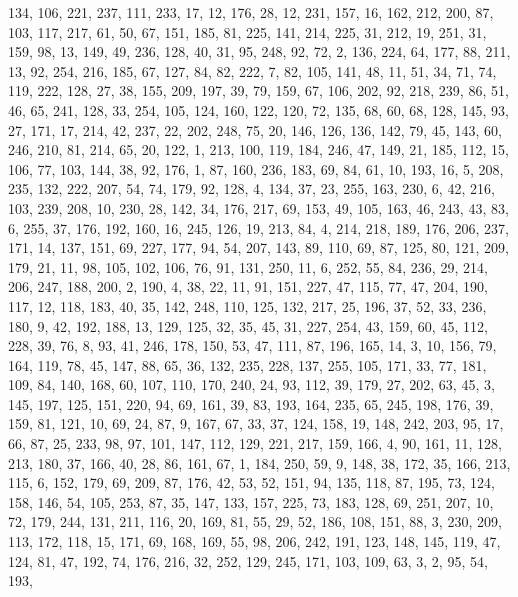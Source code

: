 \begin{DoxyCode}
       134, 106, 221, 237, 111, 233, 17, 12, 176, 28, 12, 231, 157, 16, 162, 212, 200, 87, 103, 117, 217, 61, 50,
       67, 151, 185, 81, 225, 141, 214, 225, 31, 212, 19, 251, 31, 159, 98, 13, 149, 49, 236, 128, 40, 31, 95, 248,
       92, 72, 2, 136, 224, 64, 177, 88, 211, 13, 92, 254, 216, 185, 67, 127, 84, 82, 222, 7, 82, 105, 141, 48, 11,
       51, 34, 71, 74, 119, 222, 128, 27, 38, 155, 209, 197, 39, 79, 159, 67, 106, 202, 92, 218, 239, 86, 51, 46,
       65, 241, 128, 33, 254, 105, 124, 160, 122, 120, 72, 135, 68, 60, 68, 128, 145, 93, 27, 171, 17, 214, 42,
       237, 22, 202, 248, 75, 20, 146, 126, 136, 142, 79, 45, 143, 60, 246, 210, 81, 214, 65, 20, 122, 1, 213, 100,
       119, 184, 246, 47, 149, 21, 185, 112, 15, 106, 77, 103, 144, 38, 92, 176, 1, 87, 160, 236, 183, 69, 84, 61,
       10, 193, 16, 5, 208, 235, 132, 222, 207, 54, 74, 179, 92, 128, 4, 134, 37, 23, 255, 163, 230, 6, 42, 216, 103,
       239, 208, 10, 230, 28, 142, 34, 176, 217, 69, 153, 49, 105, 163, 46, 243, 43, 83, 6, 255, 37, 176, 192,
       160, 16, 245, 126, 19, 213, 84, 4, 214, 218, 189, 176, 206, 237, 171, 14, 137, 151, 69, 227, 177, 94, 54, 207,
       143, 89, 110, 69, 87, 125, 80, 121, 209, 179, 21, 11, 98, 105, 102, 106, 76, 91, 131, 250, 11, 6, 252, 55,
       84, 236, 29, 214, 206, 247, 188, 200, 2, 190, 4, 38, 22, 11, 91, 151, 227, 47, 115, 77, 47, 204, 190, 117,
       12, 118, 183, 40, 35, 142, 248, 110, 125, 132, 217, 25, 196, 37, 52, 33, 236, 180, 9, 42, 192, 188, 13, 129,
       125, 32, 35, 45, 31, 227, 254, 43, 159, 60, 45, 112, 228, 39, 76, 8, 93, 41, 246, 178, 150, 53, 47, 111, 87,
       196, 165, 14, 3, 10, 156, 79, 164, 119, 78, 45, 147, 88, 65, 36, 132, 235, 228, 137, 255, 105, 171, 33, 77,
       181, 109, 84, 140, 168, 60, 107, 110, 170, 240, 24, 93, 112, 39, 179, 27, 202, 63, 45, 3, 145, 197, 125,
       151, 220, 94, 69, 161, 39, 83, 193, 164, 235, 65, 245, 198, 176, 39, 159, 81, 121, 10, 69, 24, 87, 9, 167, 67,
       33, 37, 124, 158, 19, 148, 242, 203, 95, 17, 66, 87, 25, 233, 98, 97, 101, 147, 112, 129, 221, 217, 159,
       166, 4, 90, 161, 11, 128, 213, 180, 37, 166, 40, 28, 86, 161, 67, 1, 184, 250, 59, 9, 148, 38, 172, 35, 166,
       213, 115, 6, 152, 179, 69, 209, 87, 176, 42, 53, 52, 151, 94, 135, 118, 87, 195, 73, 124, 158, 146, 54, 105,
       253, 87, 35, 147, 133, 157, 225, 73, 183, 128, 69, 251, 207, 10, 72, 179, 244, 131, 211, 116, 20, 169, 81,
       55, 29, 52, 186, 108, 151, 88, 3, 230, 209, 113, 172, 118, 15, 171, 69, 168, 169, 55, 98, 206, 242, 191, 123,
       148, 145, 119, 47, 124, 81, 47, 192, 74, 176, 216, 32, 252, 129, 245, 171, 103, 109, 63, 3, 2, 95, 54, 193,

\end{DoxyCode}
